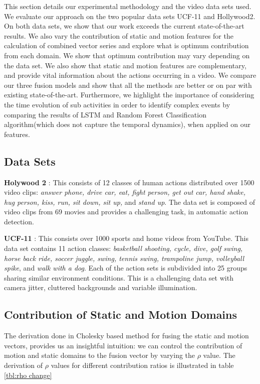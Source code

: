 This section details our experimental methodology and the  video  data sets used. We evaluate our approach on the two popular data sets
UCF-11 and Hollywood2. On both data sets, we show that our work exceeds the current state-of-the-art
results. We also vary the contribution of static and motion features for the calculation
of combined vector series and explore what is optimum contribution from each domain. We show that optimum contribution
may vary depending on the data set. We also show that static and motion features
are complementary, and provide vital information about the actions occurring in a video. We compare our three fusion models and show that
all the methods are better or on par with existing state-of-the-art. Furthermore, we highlight the importance of considering the time evolution
of sub activities in order to identify complex events by comparing the results of LSTM and Random Forest Classification algorithm(which does not capture
the temporal dynamics), when applied on our features.

\subsection{Data Sets}
\noindent
\textbf{Holywood 2} \cite{marszalek2009actions}: This consists of 12 classes of human actions distributed over 1500 video clips:
\textit{answer phone, drive car, eat, fight person, get out car, hand shake,
hug person, kiss, run, sit down, sit up, }and \textit{stand up}.
The data set is composed of video clips from 69 movies and provides a challenging task, in automatic action detection.

\noindent
\textbf{UCF-11} \cite{liu2009recognizing}: This consists over 1000
sports and home videos from YouTube. This data set contains 11 action classes:
\textit{basketball shooting, cycle, dive, golf swing, horse
back ride, soccer juggle, swing, tennis swing, trampoline
jump, volleyball spike}, and \textit{walk with a dog}. Each of the action
sets is subdivided into 25 groups sharing similar environment conditions.
This is a challenging data set with
camera jitter, cluttered backgrounds and variable illumination.


\subsection{Contribution of Static and Motion Domains}

The derivation done in Cholesky based method for fusing the static and motion vectors,
provides us an insightful intuition: we can control the contribution
of motion and static domains to the fusion vector by varying the $\rho$ value.
The derivation of $\rho$ values for different contribution ratios is illustrated in
table \ref{tbl:rho change}




